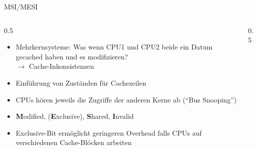 \begin{frame}[c, fragile]{MSI/MESI}{}
	\begin{columns}[c]
		\begin{column}{0.5\textwidth}
			\begin{itemize}
				\item Mehrkernsysteme: Was wenn CPU1 und CPU2 beide ein Datum gecached haben und es modifizieren?\\$\rightarrow$ Cache-Inkonsistenzen
				\item Einführung von Zuständen für Cachezeilen
				\item CPUs hören jeweils die Zugriffe der anderen Kerne ab (\enquote{Bus Snooping})
				\item \textbf{M}odified, (\textbf{E}xclusive), \textbf{S}hared, \textbf{I}nvalid
				\item Exclusive-Bit ermöglicht geringeren Overhead falls CPUs auf verschiedenen Cache-Blöcken arbeiten
			\end{itemize}
		\end{column}
		\begin{column}{0.5\textwidth}
			\begin{center}
				\resizebox{!}{0.8\textheight}{
					\mesipic[5]
				}
			\end{center}
		\end{column}
	\end{columns}
\end{frame}



